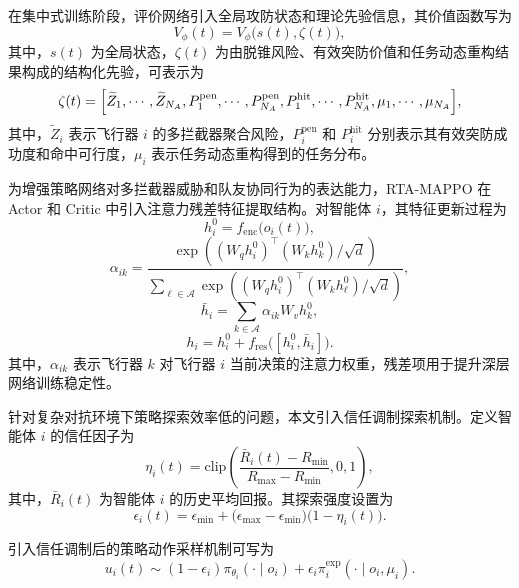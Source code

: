 在集中式训练阶段，评价网络引入全局攻防状态和理论先验信息，其价值函数写为
\begin{equation}
V_{\phi}(t)
=
V_{\phi}\bigl(s(t),\zeta(t)\bigr),
\end{equation}
其中，$s(t)$ 为全局状态，$\zeta(t)$ 为由脱锥风险、有效突防价值和任务动态重构结果构成的结构化先验，可表示为
\begin{equation}
\zeta(t)
=
\Bigl[
\widetilde Z_1,\cdots,\widetilde Z_{N_A},
P_1^{\mathrm{pen}},\cdots,P_{N_A}^{\mathrm{pen}},
P_1^{\mathrm{hit}},\cdots,P_{N_A}^{\mathrm{hit}},
\mu_1,\cdots,\mu_{N_A}
\Bigr],
\end{equation}
其中，$\widetilde Z_i$ 表示飞行器 $i$ 的多拦截器聚合风险，$P_i^{\mathrm{pen}}$ 和 $P_i^{\mathrm{hit}}$ 分别表示其有效突防成功度和命中可行度，$\mu_i$ 表示任务动态重构得到的任务分布。

为增强策略网络对多拦截器威胁和队友协同行为的表达能力，RTA-MAPPO 在 Actor 和 Critic 中引入注意力残差特征提取结构。对智能体 $i$，其特征更新过程为
\begin{equation}
h_i^{0}=f_{\mathrm{enc}}\bigl(o_i(t)\bigr),
\end{equation}
\begin{equation}
\alpha_{ik}
=
\frac{
\exp\left((W_q h_i^{0})^{\top}(W_k h_k^{0})/\sqrt{d}\right)
}{
\sum_{\ell\in\mathcal A}
\exp\left((W_q h_i^{0})^{\top}(W_k h_\ell^{0})/\sqrt{d}\right)
},
\end{equation}
\begin{equation}
\bar h_i
=
\sum_{k\in\mathcal A}\alpha_{ik}W_vh_k^{0},
\end{equation}
\begin{equation}
h_i
=
h_i^{0}
+
f_{\mathrm{res}}\bigl([h_i^{0},\bar h_i]\bigr).
\end{equation}
其中，$\alpha_{ik}$ 表示飞行器 $k$ 对飞行器 $i$ 当前决策的注意力权重，残差项用于提升深层网络训练稳定性。

针对复杂对抗环境下策略探索效率低的问题，本文引入信任调制探索机制。定义智能体 $i$ 的信任因子为
\begin{equation}
\eta_i(t)
=
\mathrm{clip}
\left(
\frac{\bar R_i(t)-R_{\min}}{R_{\max}-R_{\min}},
0,1
\right),
\end{equation}
其中，$\bar R_i(t)$ 为智能体 $i$ 的历史平均回报。其探索强度设置为
\begin{equation}
\epsilon_i(t)
=
\epsilon_{\min}
+
\bigl(\epsilon_{\max}-\epsilon_{\min}\bigr)
\bigl(1-\eta_i(t)\bigr).
\end{equation}

引入信任调制后的策略动作采样机制可写为
\begin{equation}
u_i(t)
\sim
(1-\epsilon_i)\pi_{\theta_i}(\cdot\mid o_i)
+
\epsilon_i \pi_i^{\mathrm{exp}}(\cdot\mid o_i,\mu_i).
\end{equation}

